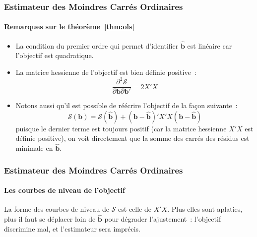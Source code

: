 \documentclass[10pt]{beamer}
\begin{document}
\begin{frame}
  \frametitle{Estimateur des Moindres Carrés Ordinaires}
  \framesubtitle{Remarques sur le théorème~\ref{thm:ols}}

  \begin{itemize}

  \item La condition du premier ordre qui permet d'identifier $\hat{\mathbf b}$ est linéaire car l'objectif est quadratique.\newline

  \item La matrice hessienne de l'objectif est bien définie positive~:
    \[
      \frac{\partial^2\mathcal S}{\partial \mathbf b \partial\mathbf b'} = 2 X'X
    \]

  \item Notons aussi qu'il est possible de réécrire l'objectif de la façon suivante~:
    \[
      \mathcal S(\mathbf b) = \mathcal S(\hat{\mathbf b}) + \left(\mathbf b - \hat{\mathbf b}  \right)' X'X \left(\mathbf b - \hat{\mathbf b}  \right)
    \]
    puisque le dernier terme est toujours positif (car la matrice hessienne $X'X$ est définie positive), on voit directement que la somme des carrés des résidus est minimale en $\hat{\mathbf b}$.

  \end{itemize}

\end{frame}


\begin{frame}[c]
  \frametitle{Estimateur des Moindres Carrés Ordinaires}
  \framesubtitle{Les courbes de niveau de l'objectif}

  \begin{center}
    \scalebox{.86}{}
  \end{center}

  \medskip

  {\small La forme des courbes de niveau de $\mathcal S$ est celle de $X'X$. Plus
    elles sont aplaties, plus il faut se déplacer loin de $\hat{\mathbf b}$ pour
    dégrader l'ajustement~: l'objectif discrimine mal, et l'estimateur sera imprécis.}

\end{frame}
\end{document}
